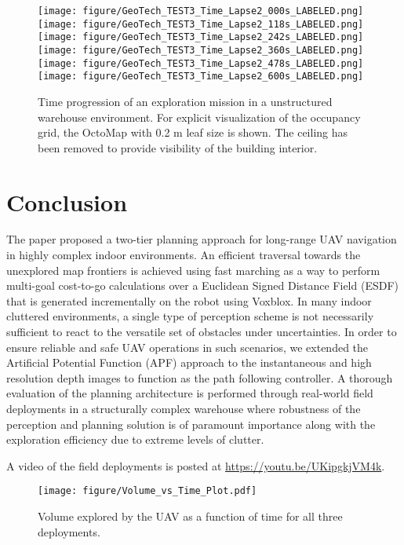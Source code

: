 \documentclass[letterpaper, 10 pt, conference]{ieeeconf}  %
\begin{document}
\begin{figure*}[h!]
		\centering
		\texttt{[image: figure/GeoTech\_TEST3\_Time\_Lapse2\_000s\_LABELED.png]}
		\texttt{[image: figure/GeoTech\_TEST3\_Time\_Lapse2\_118s\_LABELED.png]}
		\texttt{[image: figure/GeoTech\_TEST3\_Time\_Lapse2\_242s\_LABELED.png]}
		\newline
		\texttt{[image: figure/GeoTech\_TEST3\_Time\_Lapse2\_360s\_LABELED.png]}
		\texttt{[image: figure/GeoTech\_TEST3\_Time\_Lapse2\_478s\_LABELED.png]}
		\texttt{[image: figure/GeoTech\_TEST3\_Time\_Lapse2\_600s\_LABELED.png]}
		\caption{Time progression of an exploration mission in a unstructured warehouse environment. For explicit visualization of the occupancy grid, the OctoMap with 0.2 m leaf size is shown. The ceiling has been removed to provide visibility of the building interior.}
		\label{fig:GeoTech_TEST3_Timelapse}
\end{figure*}

\section{Conclusion}
\label{sec:conclusion}
The paper proposed a two-tier planning approach for long-range UAV navigation in highly complex indoor environments. An efficient traversal towards the unexplored map frontiers is achieved using fast marching as a way to perform multi-goal cost-to-go calculations over a Euclidean Signed Distance Field (ESDF) that is generated incrementally on the robot using Voxblox. In many indoor cluttered environments, a single type of perception scheme is not necessarily sufficient to react to the versatile set of obstacles under uncertainties. In order to ensure reliable and safe UAV operations in such scenarios, we extended the Artificial Potential Function (APF) approach to the instantaneous and high resolution depth images to function as the path following controller. A thorough evaluation of the planning architecture is performed through real-world field deployments in a structurally complex warehouse where robustness of the perception and planning solution is of paramount importance along with the exploration efficiency due to extreme levels of clutter. \par
A video of the field deployments is posted at \url{https://youtu.be/UKipgkjVM4k}.


\begin{figure}[h!]
		\centering
		\texttt{[image: figure/Volume\_vs\_Time\_Plot.pdf]}
		\caption{Volume explored by the UAV as a function of time for all three deployments.}
		\label{fig:Time_vs_Volume_Plot}
\end{figure}
\end{document}
